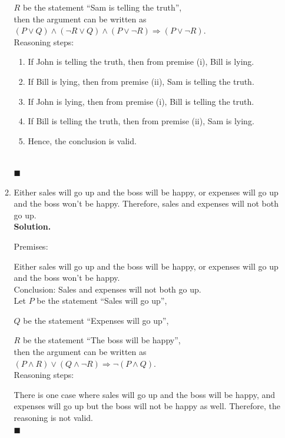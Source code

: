 \documentclass{report}
\newcommand{\sol}{\vspace{1em}\\\textbf{Solution.}\vspace{0.5em}}
\newcommand{\qed}{‎\\‎\hfill$\blacksquare$\vspace{1em}}
\begin{document}
\begin{enumerate}[leftmargin=*]
\begin{enumerate}
                    $R$ be the statement ``Sam is telling the truth'',\\

                    then the argument can be written as $(P \vee Q) \wedge (\neg R \vee Q) \wedge
                        (P \vee \neg R) \Rightarrow (P \vee \neg R)$.\\

                    Reasoning steps:
                    \begin{enumerate}
                        \item If John is telling the truth, then from premise (i), Bill is lying.

                        \item If Bill is lying, then from premise (ii), Sam is telling the truth.

                        \item If John is lying, then from premise (i), Bill is telling the truth.

                        \item If Bill is telling the truth, then from premise (ii), Sam is lying.

                        \item Hence, the conclusion is valid.
                    \end{enumerate} \qed

              \item Either sales will go up and the boss will be happy, or expenses will go up and
                    the boss won't be happy. Therefore, sales and expenses will not both go up.
                    \sol{}

                    Premises:

                    Either sales will go up and the boss will be happy, or expenses will go up and
                    the boss won't be happy.\\

                    Conclusion: Sales and expenses will not both go up.\\

                    Let $P$ be the statement ``Sales will go up'',

                    $Q$ be the statement ``Expenses will go up'',

                    $R$ be the statement ``The boss will be happy'',\\

                    then the argument can be written as $(P \wedge R) \vee (Q \wedge \neg R)
                        \Rightarrow \neg(P \wedge Q)$.\\

                    Reasoning steps:

                    There is one case where sales will go up and the boss will be happy, and
                    expenses will go up but the boss will not be happy as well. Therefore, the
                    reasoning is not valid. \qed
          \end{enumerate}
\end{enumerate}
\end{document}
